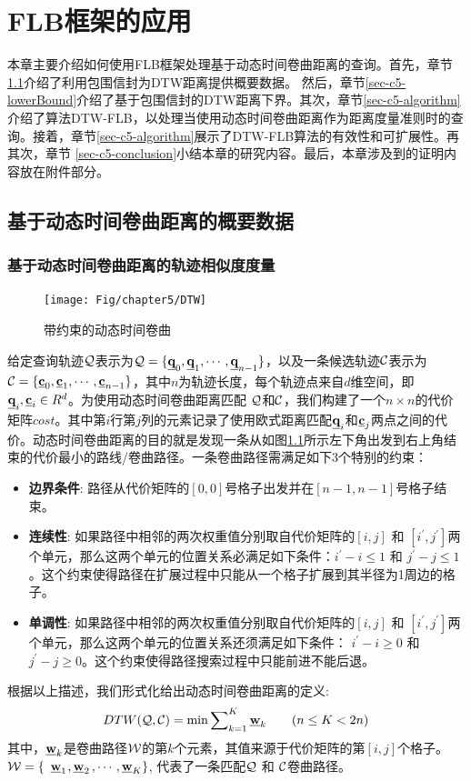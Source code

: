 \chapter{FLB框架的应用}\label{chapter:FLBDTW}

本章主要介绍如何使用FLB框架处理基于动态时间卷曲距离的查询。首先，章节\ref{sec-c5-DTWsummary}介绍了利用包围信封为DTW距离提供概要数据。 然后，章节\ref{sec-c5-lowerBound}介绍了基于包围信封的DTW距离下界。其次，章节\ref{sec-c5-algorithm}介绍了算法DTW-FLB，以处理当使用动态时间卷曲距离作为距离度量准则时的查询。接着，章节\ref{sec-c5-algorithm}展示了DTW-FLB算法的有效性和可扩展性。再其次，章节 \ref{sec-c5-conclusion}小结本章的研究内容。最后，本章涉及到的证明内容放在附件部分。


\section{基于动态时间卷曲距离的概要数据}\label{sec-c5-DTWsummary}

\subsection{基于动态时间卷曲距离的轨迹相似度度量}\label{sec-c5-DTW}
\begin{figure}[t]
	\centering
	\texttt{[image: Fig/chapter5/DTW]}
	\caption{带约束的动态时间卷曲}
	\label{fig:DTW}
\end{figure}
给定查询轨迹$\cal Q$表示为${\cal Q}=\{\emph{{\textbf{q}}}_{0}, \emph{{\textbf{q}}}_{1}, \cdots, \emph{{\textbf{q}}}_{n-1}\}$，以及一条候选轨迹$\cal C$表示为${\cal C}=\{\emph{{\textbf{c}}}_{0}, \emph{{\textbf{c}}}_{1}, \cdots, \emph{{\textbf{c}}}_{n-1}\}$，其中$n$为轨迹长度，每个轨迹点来自$d$维空间，即$\emph{{\textbf{q}}}_{i},\emph{{\textbf{c}}}_{i} \in R^{d}$。为使用动态时间卷曲距离匹配 $\cal Q$和$\cal C$，我们构建了一个$n\times n$的代价矩阵$cost$。其中第$i$行第$j$列的元素记录了使用欧式距离匹配$\emph{{\textbf{q}}}_{i}$和$\emph{{\textbf{c}}}_{j}$两点之间的代价。动态时间卷曲距离的目的就是发现一条从如图\ref{fig:DTW}所示左下角出发到右上角结束的代价最小的路线/卷曲路径。一条卷曲路径需满足如下3个特别的约束：
\begin{itemize}
	\item \textbf{边界条件}: 路径从代价矩阵的$[0,0]$号格子出发并在$[n-1,n-1]$号格子结束。
	
	\item \textbf{连续性}: 如果路径中相邻的两次权重值分别取自代价矩阵的$[i,j]$ 和 $[i^{'},j^{'}]$两个单元，那么这两个单元的位置关系必满足如下条件：$i^{'}-i\le 1$ 和 $j^{'} - j \le 1$。这个约束使得路径在扩展过程中只能从一个格子扩展到其半径为1周边的格子。
	\item \textbf{单调性}: 如果路径中相邻的两次权重值分别取自代价矩阵的$[i,j]$ 和 $[i^{'},j^{'}]$两个单元，那么这两个单元的位置关系还须满足如下条件： $i^{'}-i\ge 0$ 和 $j^{'} - j \ge 0$。这个约束使得路径搜索过程中只能前进不能后退。
\end{itemize}
根据以上描述，我们形式化给出动态时间卷曲距离的定义:
\begin{eqnarray}\label{eq:dtwDef}
DTW({\cal Q}, {\cal C})= \min{\sum\nolimits_{k=1}^{K}\emph{{\textbf{w}}}_{k}} \qquad {(n\le K < 2n)}
\end{eqnarray}
其中，$\emph{{\textbf{w}}}_{k}$是卷曲路径$\cal W$的第$k$个元素，其值来源于代价矩阵的第$[i,j]$个格子。
$\cal{W}=\{$ $\emph{{\textbf{w}}}_{1}$$,\emph{{\textbf{w}}}_{2}$$,\cdots,\emph{{\textbf{w}}}_{K}\}$, 代表了一条匹配$\cal{Q}$ 和 $\cal{C}$卷曲路径。


